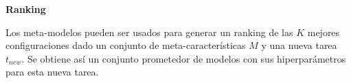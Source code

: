 \quad

\textbf{Ranking}



\quad


Los meta-modelos pueden ser usados para generar un ranking de las $K$ mejores configuraciones dado un conjunto de meta-características $M$ y una nueva tarea $t_{new}$. Se obtiene así un conjunto prometedor de modelos con sus hiperparámetros para esta nueva tarea.
 

